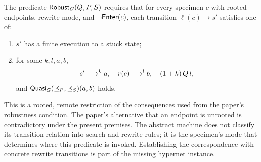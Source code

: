 \begin{definition}[Robustness]\label{term:robustness}
The predicate $\mathsf{Robust}_G(Q,P,S)$ requires that for every specimen $c$
with rooted endpoints, rewrite mode, and $\neg\mathsf{Enter}(c)$, each transition
$\ell(c)\to s'$ satisfies one of:
\begin{enumerate}[label=\textup{(\roman*)}]
\item $s'$ has a finite execution to a stuck state;
\item for some $k,l,a,b$,
  \[
   s'\mathrel{\longrightarrow^{k}}a,\quad r(c)\mathrel{\longrightarrow^{l}}b,\quad (1+k)\,Q\,l,
  \]
  and $\mathsf{Quasi}_G(\preceq_P,\preceq_S)(a,b)$ holds.
\end{enumerate}
\end{definition}
This is a rooted, remote restriction of the consequences used from the
paper's robustness condition. The paper's alternative that an endpoint is
unrooted is contradictory under the present premises. The abstract
machine does not classify its transition relation into search and rewrite
rules; it is the specimen's mode that determines where this predicate is
invoked. Establishing the correspondence with concrete rewrite transitions
is part of the missing hypernet instance.
